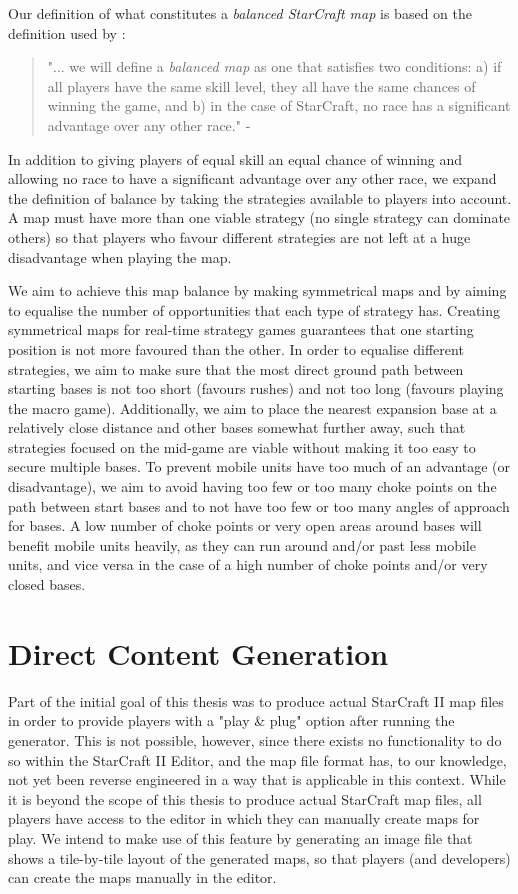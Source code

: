 Our definition of what constitutes a \textit{balanced StarCraft map} is based on the definition used by \citeauthor{uriarte2013psmage}\cite{uriarte2013psmage}:
\begin{quote}
	"... we will define a \textit{balanced map} as one that satisfies two conditions: a) if all players have the same skill level, they all have the same chances of winning the game, and b) in the case of StarCraft, no race has a significant advantage over any other race." - \citeauthor{uriarte2013psmage}\cite{uriarte2013psmage}
\end{quote}

In addition to giving players of equal skill an equal chance of winning and allowing no race to have a significant advantage over any other race, we expand the definition of balance by taking the strategies available to players into account. A map must have more than one viable strategy (no single strategy can dominate others) so that players who favour different strategies are not left at a huge disadvantage when playing the map. 

We aim to achieve this map balance by making symmetrical maps and by aiming to equalise the number of opportunities that each type of strategy has. Creating symmetrical maps for real-time strategy games guarantees that one starting position is not more favoured than the other. In order to equalise different strategies, we aim to make sure that the most direct ground path between starting bases is not too short (favours rushes) and not too long (favours playing the macro game). Additionally, we aim to place the nearest expansion base at a relatively close distance and other bases somewhat further away, such that strategies focused on the mid-game are viable without making it too easy to secure multiple bases. To prevent mobile units have too much of an advantage (or disadvantage), we aim to avoid having too few or too many choke points on the path between start bases and to not have too few or too many angles of approach for bases. A low number of choke points or very open areas around bases will benefit mobile units heavily, as they can run around and/or past less mobile units, and vice versa in the case of a high number of choke points and/or very closed bases.

\section{Direct Content Generation}
\label{goals_representation}
Part of the initial goal of this thesis was to produce actual StarCraft II map files in order to provide players with a "play \& plug" option after running the generator. This is not possible, however, since there exists no functionality to do so within the StarCraft II Editor, and the map file format has, to our knowledge, not yet been reverse engineered in a way that is applicable in this context. While it is beyond the scope of this thesis to produce actual StarCraft map files, all players have access to the editor in which they can manually create maps for play. We intend to make use of this feature by generating an image file that shows a tile-by-tile layout of the generated maps, so that players (and developers) can create the maps manually in the editor.

